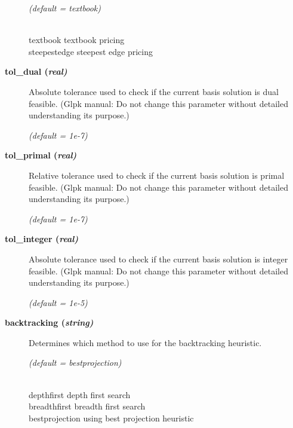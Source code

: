 \begin{description}
\textsl{(default = textbook)}
\begin{tabbing}
\hspace{1in} \= \\
textbook \> textbook pricing \\
steepestedge \> steepest edge pricing
\end{tabbing}

\item[\label{glpktol_dual}\hypertarget{glpktol_dual}
{\textbf{tol\_dual (\slshape{real})}}]\hspace{1.0in}

Absolute tolerance used to check if the current basis solution is dual feasible.
(Glpk manual: Do not change this parameter without detailed understanding its purpose.)

\textsl{(default = 1e-7)}

\item[\label{glpktol_primal}\hypertarget{glpktol_primal}
{\textbf{tol\_primal (\slshape{real})}}]\hspace{1.0in}

Relative tolerance used to check if the current basis solution is primal feasible.
(Glpk manual: Do not change this parameter without detailed understanding its purpose.)

\textsl{(default = 1e-7)}

\item[\label{glpktol_integer}\hypertarget{glpktol_integer}
{\textbf{tol\_integer (\slshape{real})}}]\hspace{1.0in}

Absolute tolerance used to check if the current basis solution is integer feasible.
(Glpk manual: Do not change this parameter without detailed understanding its purpose.)

\textsl{(default = 1e-5)}

\item[\label{backtracking}\hypertarget{backtracking}
{\textbf{backtracking (\slshape{string})}}]\hspace{1.0in}

Determines which method to use for the backtracking heuristic.

\textsl{(default = bestprojection)}
\begin{tabbing}
\hspace{1in} \= \\
depthfirst \> depth first search \\
breadthfirst \> breadth first search \\
bestprojection \> using best projection heuristic
\end{tabbing}


\end{description}
